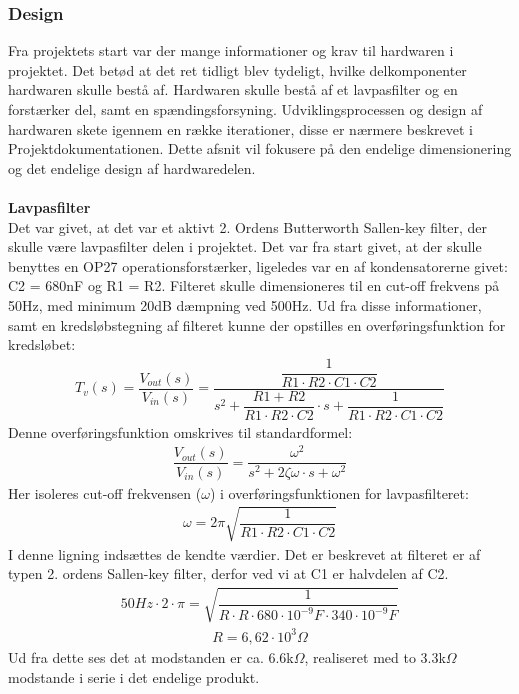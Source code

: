 \subsubsection{Design}
Fra projektets start var der mange informationer og krav til hardwaren i projektet. Det betød at det ret tidligt blev tydeligt, hvilke delkomponenter hardwaren skulle bestå af. Hardwaren skulle bestå af et lavpasfilter og en forstærker del, samt en spændingsforsyning. Udviklingsprocessen og design af hardwaren skete igennem en række iterationer, disse er nærmere beskrevet i Projektdokumentationen. Dette afsnit vil fokusere på den endelige dimensionering og det endelige design af hardwaredelen.\\\\
\textbf{Lavpasfilter}\\
Det var givet, at det var et aktivt 2. Ordens Butterworth Sallen-key filter, der skulle være lavpasfilter delen i projektet. Det var fra start givet, at der skulle benyttes en OP27 operationsforstærker, ligeledes var en af kondensatorerne givet: C2 = 680nF og R1 = R2. Filteret skulle dimensioneres til en cut-off frekvens på 50Hz, med minimum 20dB dæmpning ved 500Hz. Ud fra disse informationer, samt en kredsløbstegning af filteret kunne der opstilles en overføringsfunktion for kredsløbet:
\begin{align}
T_{v}(s)=\dfrac{V_{out}(s)}{V_{in}(s)}=\dfrac{\dfrac{1}{R1\cdot R2\cdot C1\cdot C2}}{s^2+\dfrac{R1 + R2}{R1\cdot R2\cdot C2}\cdot s+\dfrac{1}{R1\cdot R2\cdot C1\cdot C2}}
\end{align}
Denne overføringsfunktion omskrives til standardformel:
\begin{align}
\dfrac{V_{out}(s)}{V_{in}(s)}=\dfrac{\omega^2}{s^2+2\zeta\omega\cdot s+\omega^2}
\end{align}
Her isoleres cut-off frekvensen ($\omega$) i overføringsfunktionen for lavpasfilteret:
\begin{align}
\omega = 2\pi\sqrt{\dfrac{1}{R1\cdot R2\cdot C1\cdot C2}}
\end{align}
I denne ligning indsættes de kendte værdier. Det er beskrevet at filteret er af typen 2. ordens Sallen-key filter, derfor ved vi at C1 er halvdelen af C2.\cite{wikifilter}
\begin{align}
50Hz\cdot 2\cdot \pi = \sqrt{\dfrac{1}{R\cdot R\cdot 680\cdot 10^{-9}F\cdot 340\cdot 10^{-9}F}}
\end{align}
\begin{align}
R=6,62\cdot 10^3 \Omega
\end{align}
Ud fra dette ses det at modstanden er ca. 6.6k$\Omega$, realiseret med to 3.3k$\Omega$ modstande i serie i det endelige produkt.\\\\
